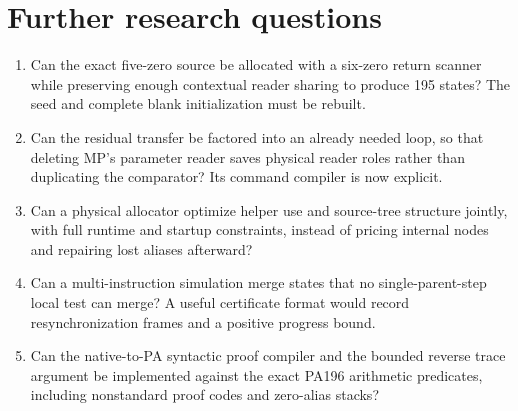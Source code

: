 \documentclass[11pt,letterpaper]{article}
\begin{document}
\section{Further research questions}

\begin{enumerate}
\item Can the exact five-zero source be allocated with a six-zero return
scanner while preserving enough contextual reader sharing to produce
195 states? The seed and complete blank initialization must be rebuilt.
\item Can the residual transfer be factored into an already needed loop,
so that deleting MP's parameter reader saves physical reader roles rather
than duplicating the comparator? Its command compiler is now explicit.
\item Can a physical allocator optimize helper use and source-tree
structure jointly, with full runtime and startup constraints, instead of
pricing internal nodes and repairing lost aliases afterward?
\item Can a multi-instruction simulation merge states that no
single-parent-step local test can merge? A useful certificate format would
record resynchronization frames and a positive progress bound.
\item Can the native-to-PA syntactic proof compiler and the bounded reverse
trace argument be implemented against the exact PA196 arithmetic predicates,
including nonstandard proof codes and zero-alias stacks?
\end{enumerate}
\end{document}
